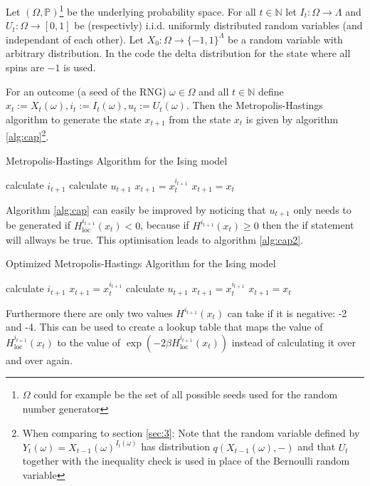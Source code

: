 \documentclass[a4paper]{article}
\begin{document}
Let $(\Omega, \mathbb{P})$\footnote{$\Omega$ could
for example be the set of all possible seeds used for the random number generator}
be the underlying probability space.
For all $t \in \mathbb{N}$ let $I_t : \Omega \to \Lambda$ and
$U_t : \Omega \to [0,1]$ be (respectivly) i.i.d. uniformly distributed random variables
(and independant of each other).
Let $X_0 : \Omega \to \{-1,1 \}^\Lambda$ be a random variable with arbitrary distribution.
In the code the delta distribution for the state where all spins are $-1$ is used.

For an outcome (a seed of the RNG) $\omega \in \Omega$
and all $t \in \mathbb{N}$ define $x_t := X_t (\omega),i_t := I_t(\omega), u_t := U_t(\omega)$.
Then the Metropolis-Hastings algorithm to generate the state $x_{t+1}$
from the state $x_t$ is given by algorithm \ref{alg:cap}\footnote{When comparing to section \ref{sec:3}: Note that the random variable defined by $Y_t (\omega)=  X_{t-1}(\omega)^{I_{t}(\omega)}$ has distribution $q(X_{t-1}(\omega),-)$ and that $U_t$ together with the inequality check is used in place of the Bernoulli random variable}.
\begin{algorithm}
    \caption{Metropolis-Hastings Algorithm for the Ising model}\label{alg:cap}
\begin{algorithmic}
    \State calculate $i_{t+1}$
    \State calculate $u_{t+1}$
        \State $x_{t+1} = x^{i_{t+1}}_{t}$
    \Else
    \State $x_{t+1} = x_{t}$
    \EndIf 
\end{algorithmic}
\end{algorithm}
Algorithm \ref{alg:cap} can easily be improved by noticing that $u_{t+1}$ only needs to
be generated if $H_{\mathrm{loc}}^{i_{t+1}}(x_t)< 0$,
because if $H^{i_{t+1}}(x_t) \geq 0$ then the if statement will allways be true.
This optimisation leads to algorithm \ref{alg:cap2}.
\begin{algorithm}
    \caption{Optimized Metropolis-Hastings Algorithm for the Ising model}\label{alg:cap2}
\begin{algorithmic}
    \State calculate $i_{t+1}$
        \State $x_{t+1} = x^{i_{t+1}}_{t}$
    \Else
    \State calculate $u_{t+1}$
            \State $x_{t+1} = x^{i_{t+1}}_{t}$
        \Else
            \State $x_{t+1} = x_{t}$
        \EndIf
    \EndIf 
\end{algorithmic}
\end{algorithm}
Furthermore there are only two values $H^{i_{t+1}}(x_t) $ can take if it is negative: -2 and -4.
This can be used to create a lookup table that maps the value of $H_{\mathrm{loc}}^{i_{t+1}}(x_t)$
to the value of $\exp ( - 2 \beta  H_{\mathrm{loc}}^{i_{t+1}}(x_t))$ instead of calculating it
over and over again.
\end{document}
